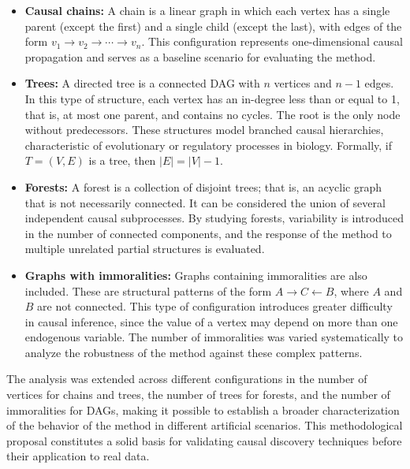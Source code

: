\documentclass[12pt,a4paper]{report}
\begin{document}
\begin{itemize}
    \item \textbf{Causal chains:} A chain is a linear graph in which each vertex has a single parent (except the first) and a single child (except the last), with edges of the form \( v_1 \rightarrow v_2 \rightarrow \cdots \rightarrow v_n \). This configuration represents one-dimensional causal propagation and serves as a baseline scenario for evaluating the method.

    \item \textbf{Trees:} A directed tree is a connected DAG with \( n \) vertices and \( n-1 \) edges. In this type of structure, each vertex has an in-degree less than or equal to 1, that is, at most one parent, and contains no cycles. The root is the only node without predecessors. These structures model branched causal hierarchies, characteristic of evolutionary or regulatory processes in biology. Formally, if \( T = (V, E) \) is a tree, then \( |E| = |V| - 1 \).

    \item \textbf{Forests:} A forest is a collection of disjoint trees; that is, an acyclic graph that is not necessarily connected. It can be considered the union of several independent causal subprocesses. By studying forests, variability is introduced in the number of connected components, and the response of the method to multiple unrelated partial structures is evaluated.

    \item \textbf{Graphs with immoralities:} Graphs containing immoralities are also included. These are structural patterns of the form \( A \rightarrow C \leftarrow B \), where \( A \) and \( B \) are not connected. This type of configuration introduces greater difficulty in causal inference, since the value of a vertex may depend on more than one endogenous variable. The number of immoralities was varied systematically to analyze the robustness of the method against these complex patterns.

\end{itemize}

The analysis was extended across different configurations in the number of vertices for chains and trees, the number of trees for forests, and the number of immoralities for DAGs, making it possible to establish a broader characterization of the behavior of the method in different artificial scenarios. This methodological proposal constitutes a solid basis for validating causal discovery techniques before their application to real data.
\end{document}

